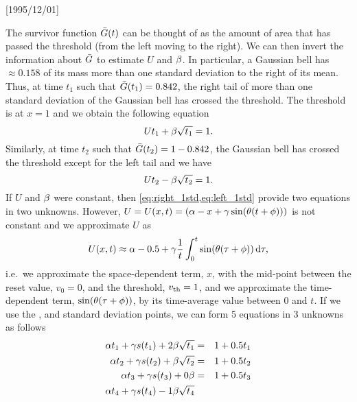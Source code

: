 \NeedsTeXFormat{LaTeX2e}[1995/12/01] \documentclass[10pt]{bmc_article}
\newenvironment{bmcformat}{\begin{raggedright}\baselineskip20pt\sloppy\setboolean{publ}{false}}{\end{raggedright}\baselineskip20pt\sloppy}
\begin{document}
\begin{bmcformat}
The survivor function ${ \bar{G} }(t)$ can be thought of as the amount of area that has
passed the threshold (from the left moving to the right). We can then invert the
information about ${ \bar{G} }$ to estimate $U$ and ${\beta}$. In particular, a Gaussian bell
has $\approx 0.158$ of its mass more than one standard deviation to the right of
its mean. Thus, at time $t_1$ such that ${ \bar{G} }(t_1) = 0.842$, the right tail of
more than one standard deviation of the Gaussian bell has crossed the threshold.
The threshold is at $x = 1$ and we obtain the following equation
\begin{equation}
U t_1 + {\beta} \sqrt{t_1} = 1.
\label{eq:right_1std}
\end{equation}
Similarly, at time $t_2$ such that ${ \bar{G} }(t_2) = 1 - 0.842$, the Gaussian bell has
crossed the threshold except for the left tail and we have
\begin{equation}
U t_2 - {\beta} \sqrt{t_2} = 1.
\label{eq:left_1std}
\end{equation}
If $U$ and ${\beta}$ were constant, then \cref{eq:right_1std,eq:left_1std} provide
two equations in two unknowns.
However, $U = U(x,t) = ({\alpha} - x + {\gamma } \sin({\theta} (t + \phi)) )$ is not constant and
we approximate $U$ as
\begin{equation}
U(x,t ) \approx {\alpha} -0.5 + {\gamma } \frac{1}{t}\int_0^t \sin({\theta} ({\tau}+\phi)) \, \mathrm{d} {\tau}, 
\end{equation}
i.e.\ we approximate the space-dependent term, $x$, with the mid-point between
the reset value, $v_0 = 0$, and the threshold, ${ v_{\textrm{th} } } = 1$, and we approximate
the time-dependent term, $\sin({\theta} ({\tau}+\phi))$, by its time-average value
between $0$ and $t$. If we use the ,  and  standard 
deviation points, we can form 5 equations in 3 unknowns as follows
\begin{eqnarray*}
\a t_1 + \g s(t_1) + 2\b \sqrt{t_1}
&=& 1 + 0.5 t_1
\\
\a t_2 + \g s(t_2) + \b \sqrt{t_2}
&=& 1 + 0.5 t_2 
\\
\a t_3 + \g s(t_3) + 0\b
&=& 1 + 0.5 t_3
\\
\a t_4 + \g s(t_4)-1 \b \sqrt{t_4}

\end{eqnarray*}
\end{bmcformat}
\end{document}
